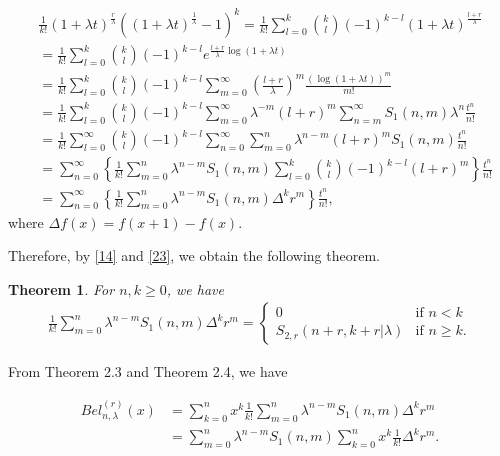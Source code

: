 \documentclass[10pt,twoside,reqno]{amsart}
\numberwithin{equation}{section}
\newtheorem{thm}{\bf Theorem}[section]
\begin{document}
\begin{equation}\begin{split}\label{23}
& \frac{1}{k!} (1+\lambda t)^{\frac{r}{\lambda }}((1+\lambda t)^{\frac{1}{\lambda }}-1)^k = \frac{1}{k!} \sum_{l=0}^k {k \choose l} (-1)^{k-l} (1+\lambda t)^{\frac{l+r}{\lambda }}\\
&= \frac{1}{k!} \sum_{l=0}^k {k \choose l} (-1)^{k-l} e^{\frac{l+r}{\lambda }\log(1+\lambda t)} \\&= \frac{1}{k!} \sum_{l=0}^k {k \choose l} (-1)^{k-l} \sum_{m=0}^\infty \left( \frac{l+r}{\lambda } \right)^m \frac{(\log(1+\lambda t))^m}{m!}\\
&=\frac{1}{k!}\sum_{l=0}^k {k \choose l} (-1)^{k-l} \sum_{m=0}^\infty \lambda ^{-m} (l+r)^m \sum_{n=m}^\infty S_1(n,m) \lambda ^n \frac{t^n}{n!}\\
&= \frac{1}{k!} \sum_{l=0}^\infty {k \choose l} (-1)^{k-l} \sum_{n=0}^\infty \sum_{m=0}^n \lambda ^{n-m} (l+r)^m S_1(n,m) \frac{t^n}{n!}\\
&= \sum_{n=0}^\infty \left\{ \frac{1}{k!} \sum_{m=0}^n \lambda ^{n-m} S_1(n,m) \sum_{l=0}^k {k \choose l} (-1)^{k-l} (l+r)^m \right\} \frac{t^n}{n!}\\
&= \sum_{n=0}^\infty \left\{ \frac{1}{k!} \sum_{m=0}^n \lambda ^{n-m} S_1(n,m) \Delta^k r^m \right\} \frac{t^n}{n!},
\end{split}\end{equation}
where $\Delta f(x) = f(x+1) - f(x)$.

Therefore, by \eqref{14} and \eqref{23}, we obtain the following theorem.

\begin{thm}
For $n,k \geq 0$, we have
\begin{equation*}\begin{split}
\frac{1}{k!} \sum_{m=0}^n \lambda^{n-m} S_1(n,m) \Delta^k r^m = \begin{cases}
0&\text{if}\,\, n <k    \\
S_{2,r}(n+r,k+r|\lambda)&\text{if}\,\,n \geq k.
\end{cases}
\end{split}\end{equation*}
\end{thm}
From Theorem 2.3 and Theorem 2.4, we have

\begin{equation}\begin{split}\label{24}
Bel_{n,\lambda }^{(r)}(x)& = \sum_{k=0}^n x^k \frac{1}{k!} \sum_{m=0}^n \lambda ^{n-m} S_1(n,m) \Delta^k r^m\\
&= \sum_{m=0}^n \lambda ^{n-m} S_1(n,m) \sum_{k=0}^n x^k \frac{1}{k!} \Delta^k r^m.
\end{split}\end{equation}
\end{document}
